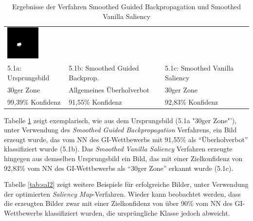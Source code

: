 \begin{table}
\begin{tabular}{p{4.5cm}p{4.5cm}p{4.5cm}}
		\includegraphics[width=\linewidth]{Images/AnPe/5_1_Rechts}\\ 
		5.1a: Ursprungsbild &5.1b: Smoothed Guided Backprop. &5.1c: Smoothed Vanilla Saliency \\
		30ger Zone & Allgemeines Überholverbot & 30ger Zone\\
		99,39\% Konfidenz & 91,55\% Konfidenz & 92,83\% Konfidenz\\
		
	\end{tabular} 

	\caption{Ergebnisse der Verfahren Smoothed Guided Backpropagation und Smoothed Vanilla Saliency}
	\label{tab:sal1}
\end{table}

Tabelle \ref{tab:sal1} zeigt exemplarisch, wie aus dem Ursprungsbild (5.1a "30ger Zone"'), unter Verwendung des \textit{Smoothed Guided Backpropagation} Verfahrens, ein Bild erzeugt wurde, das vom \ac{NN} des \ac{GI}-Wettbewerbs mit 91,55\% als "`Überholverbot"' klassifiziert wurde (5.1b). 
Das \textit{Smoothed Vanilla Saliency} Verfahren erzeugte hingegen aus demselben Ursprungsbild ein Bild, das mit einer Zielkonfidenz von 92,83\% vom \ac{NN} des \ac{GI}-Wettbewerbs als "`30ger Zone"' erkannt wurde (5.1c).

Tabelle \ref{tab:sal2} zeigt weitere Beispiele für erfolgreiche Bilder, unter Verwendung der optimierten \textit{Saliency Map}-Verfahren. 
Wieder kann beobachtet werden, dass die erzeugten Bilder zwar mit einer Zielkonfidenz von über 90\% vom \ac{NN} des \ac{GI}-Wettbewerbs klassifiziert wurden, die ursprüngliche Klasse jedoch abweicht.

